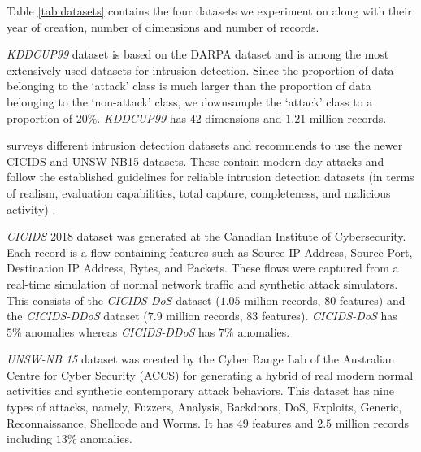 \documentclass[sigconf]{acmart}
\begin{document}
Table \ref{tab:datasets} contains the four datasets we experiment on along with their year of creation, number of dimensions and number of records.
\fi

\emph{KDDCUP99} dataset \cite{KDDCup192:online} is based on the DARPA dataset and is among the most extensively used datasets for intrusion detection. Since the proportion of data belonging to the `attack' class is much larger than the proportion of data belonging to the `non-attack' class, we downsample the `attack' class to a proportion of $20\%$. \emph{KDDCUP99} has $42$ dimensions and $1.21$ million records.

\cite{ring2019survey} surveys different intrusion detection datasets and recommends to use the newer CICIDS \cite{sharafaldin2018toward} and UNSW-NB15 \cite{moustafa2015unsw} datasets. These contain modern-day attacks and follow the established guidelines for reliable intrusion detection datasets (in terms of realism, evaluation capabilities, total capture, completeness, and malicious activity) \cite{sharafaldin2018toward}.

\emph{CICIDS} 2018 dataset was generated at the Canadian Institute of Cybersecurity. Each record is a flow containing features such as Source IP Address, Source Port, Destination IP Address, Bytes, and Packets. These flows were captured from a real-time simulation of normal network traffic and synthetic attack simulators. This consists of the \emph{CICIDS-DoS} dataset ($1.05$ million records, 80 features) and the \emph{CICIDS-DDoS} dataset ($7.9$ million records, 83 features). \emph{CICIDS-DoS} has $5\%$ anomalies whereas \emph{CICIDS-DDoS} has $7\%$ anomalies.

\emph{UNSW-NB 15} dataset was created by the Cyber Range Lab of the Australian Centre for Cyber Security (ACCS) for generating a hybrid of real modern normal activities and synthetic contemporary attack behaviors. This dataset has nine types of attacks, namely, Fuzzers, Analysis, Backdoors, DoS, Exploits, Generic, Reconnaissance, Shellcode and Worms. It has $49$ features and $2.5$ million records including $13\%$ anomalies.
\end{document}
